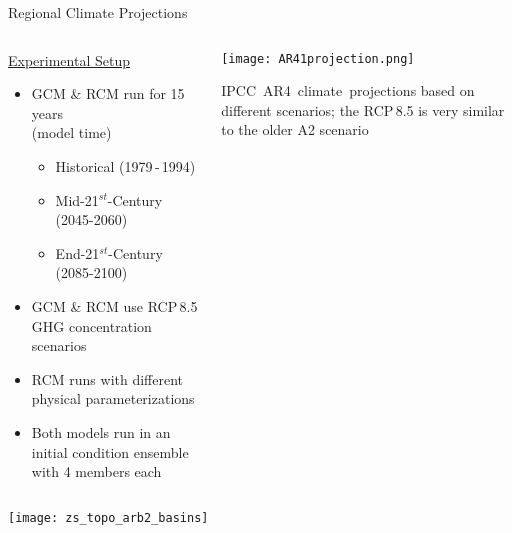 \documentclass[hyperref={pdfpagelabels=false},compress,final]{beamer}
\newcommand{\st}{\ensuremath{^{st}}}
\newenvironment{myBox}[3][shadow=true]%
{\begin{center} \begin{minipage}{#2} \begin{beamerboxesrounded}[#1]{#3} \smallskip}%
{\smallskip \end{beamerboxesrounded} \end{minipage} \end{center}}
\begin{document}
\begin{frame}{Regional Climate Projections}
  \begin{columns}[T]
    \begin{column}{0.6\textwidth}
      \underline{\Large Experimental Setup}\medskip
      \small
      \begin{itemize}
        \item GCM \& RCM run for 15\,years \\ (model time) \smallskip
        \begin{itemize}
          \item Historical (1979\,-\,1994) \smallskip
          \item Mid-21\st-Century (2045-2060) \smallskip
          \item End-21\st-Century (2085-2100)
        \end{itemize} \smallskip %
        \item GCM \& RCM use RCP\,8.5 GHG concentration scenarios
        \item RCM runs with different physical parameterizations \smallskip %
        \item Both models run in an initial condition ensemble with 4 members each
      \end{itemize}
    \end{column}
    \begin{column}{0.4\textwidth}
      \vspace*{-.8cm} \hspace*{-.8cm}
      \texttt{[image: AR41projection.png]}
      \begin{myBox}{\textwidth}{}
        {\footnotesize \mbox{IPCC AR4 climate projections} based on different scenarios; %
          the RCP\,8.5 is very similar to the older A2 scenario}
      \end{myBox}
    \end{column}
  \end{columns}
\end{frame}

\begin{frame}
  \begin{center}
    \vspace*{-0.75cm}
    \texttt{[image: zs\_topo\_arb2\_basins]}
  \end{center}
\end{frame}
\end{document}
